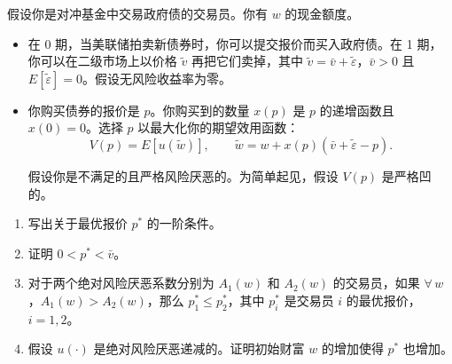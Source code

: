 \begin{samepage}
\begin{problem}
 假设你是对冲基金中交易政府债的交易员。你有 $w$ 的现金额度。
\begin{itemize}
    \item 在 0 期，当美联储拍卖新债券时，你可以提交报价而买入政府债。在 1 期，你可以在二级市场上以价格 $\tilde{v}$ 再把它们卖掉，其中 $\tilde{v}=\bar{v}+\tilde{\varepsilon}$，$\bar{v}>0$ 且 $E[\tilde{\varepsilon}]=0$。假设无风险收益率为零。
    \item 你购买债券的报价是 $p$。你购买到的数量 $x(p)$ 是 $p$ 的递增函数且 $x(0)=0$。选择 $p$ 以最大化你的期望效用函数：
    \[
        V(p)=E[u(\tilde{w})],\qquad \tilde{w}=w+x(p)(\bar{v}+\tilde{\varepsilon}-p).
    \]

    假设你是不满足的且严格风险厌恶的。为简单起见，假设 $V(p)$ 是严格凹的。
\end{itemize}
\begin{enumerate}[label=(\alph*)]
    \item 写出关于最优报价 $p^{*}$ 的一阶条件。
    \item 证明 $0<p^{*}<\bar{v}$。
    \item 对于两个绝对风险厌恶系数分别为 $A_{1}(w)$ 和 $A_{2}(w)$ 的交易员，如果 $\forall\,w$，$A_{1}(w)>A_{2}(w)$，那么 $p_{1}^{*}\le p_{2}^{*}$，其中 $p_{i}^{*}$ 是交易员 $i$ 的最优报价，$i=1,2$。
    \item 假设 $u(\cdot)$ 是绝对风险厌恶递减的。证明初始财富 $w$ 的增加使得 $p^{*}$ 也增加。
\end{enumerate}
\end{problem}
\end{samepage}
